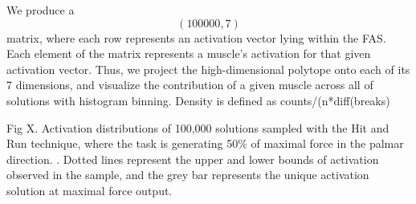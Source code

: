 

We produce a $$(100000,7)$$ matrix, where each row represents an activation vector lying within the FAS. Each element of the matrix represents a muscle's activation for that given activation vector. Thus, we project the high-dimensional polytope onto each of its 7 dimensions, and visualize the contribution of a given muscle across all of solutions with histogram binning. Density is defined as counts/(n*diff(breaks)



Fig X. Activation distributions of 100,000 solutions sampled with the Hit and Run technique, where the task is generating 50\% of maximal force in the palmar direction. . Dotted lines represent the upper and lower bounds of activation observed in the sample, and the grey bar represents the unique activation solution at maximal force output.
